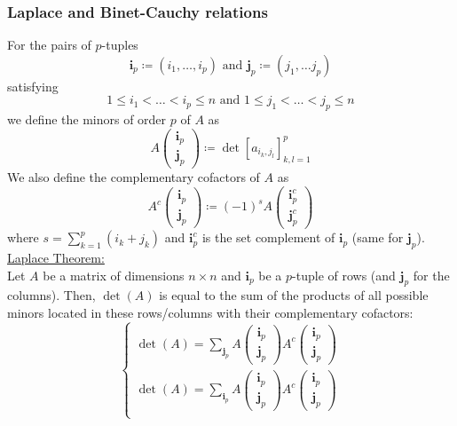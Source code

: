 \documentclass[12pt, openany]{report}
\theoremstyle{definition}
\begin{document}
\subsubsection{Laplace and Binet-Cauchy relations}
For the pairs of \(p\)-tuples \[\textbf{i}_p \coloneqq (i_1,\dots,i_p)\text{ and }\textbf{j}_p\coloneqq (j_1,\dots j_p)\] satisfying \[1\le i_1<\dots<i_p\le n\text{ and } 1\le j_1<\dots<j_p\le n\] we define the minors of order \(p\) of \(A\) as 
\begin{equation}
    A\begin{pmatrix}
        \textbf{i}_p\\ \textbf{j}_p
    \end{pmatrix} \coloneqq \det[a_{i_k,j_l}]_{k,l=1}^p
\end{equation}
We also define the complementary cofactors of \(A\) as 
\begin{equation}
    A^c\begin{pmatrix}
        \textbf{i}_p\\ \textbf{j}_p
    \end{pmatrix} \coloneqq (-1)^s A\begin{pmatrix}
        \textbf{i}_p^c\\ \textbf{j}_p^c
    \end{pmatrix}
\end{equation}
where \(s = \sum_{k=1}^p(i_k+j_k)\) and \(\textbf{i}_p^c\) is the set complement of \(\textbf{i}_p\) (same for \(\textbf{j}_p\)). \\
\underline{Laplace Theorem:}\\
Let \(A\) be a matrix of dimensions \(n\times n\) and \(\textbf{i}_p\) be a \(p\)-tuple of rows (and \(\textbf{j}_p\) for the columns). Then, \(\det(A)\) is equal to the sum of the products of all possible minors located in these rows/columns with their complementary cofactors:
\begin{equation}
    \begin{cases}
        \det(A) = \sum_{\textbf{j}_p}A\begin{pmatrix}
            \textbf{i}_p\\\textbf{j}_p
        \end{pmatrix} A^c\begin{pmatrix}
            \textbf{i}_p\\\textbf{j}_p
        \end{pmatrix}\\
        \det(A) = \sum_{\textbf{i}_p}A\begin{pmatrix}
            \textbf{i}_p\\\textbf{j}_p
        \end{pmatrix} A^c\begin{pmatrix}
            \textbf{i}_p\\\textbf{j}_p
        \end{pmatrix}\\
    \end{cases}
\end{equation}
\end{document}
